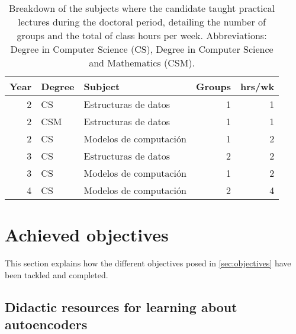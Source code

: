 \begin{table}
    \begin{tabular}{rllrr}
        \toprule
        Year & Degree & Subject & Groups & hrs/wk\\
        \midrule
        2 & CS & Estructuras de datos & 1 & 1\\
        2 & CSM & Estructuras de datos & 1 & 1\\
        2 & CS & Modelos de computación & 1 & 2\\
        3 & CS & Estructuras de datos & 2 & 2\\
        3 & CS & Modelos de computación & 1 & 2\\
        4 & CS & Modelos de computación & 2 & 4\\
        \bottomrule
    \end{tabular}
    \caption{\label{tbl:classes}Breakdown of the subjects where the candidate taught practical lectures during the doctoral period, detailing the number of groups and the total of class hours per week. Abbreviations: Degree in Computer Science (CS), Degree in Computer Science and Mathematics (CSM).}
\end{table}


\section{Achieved objectives}

This section explains how the different objectives posed in \autoref{sec:objectives} have been tackled and completed.

\subsection{Didactic resources for learning about autoencoders}



